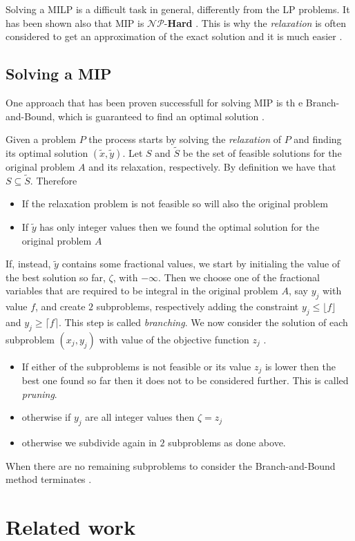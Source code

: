Solving a \acrshort{MILP} is a difficult task in general, differently from the
\acrshort{LP} problems. It has been shown also that \acrshort{MIP} is
$\mathcal{NP}$-\textbf{Hard}
\cite{Kannan1978}\cite{Liberti2019}\cite{Schrijver1998}. This is why the \emph{relaxation} is often considered
to get an approximation of the exact solution and it is much easier
\cite{Conforti2016}.

\subsection{Solving a MIP}%
\label{sub:solving_a_mip}

One approach that has been proven successfull for solving \acrshort{MIP} is th
e Branch-and-Bound, which is guaranteed to find an optimal solution
\cite{Conforti2016}\cite{Edgar2001}.

Given a problem $P$ the process starts by solving the \emph{relaxation} of $P$
and finding its optimal solution $(\tilde{x}, \tilde{y})$.
Let $S$ and  $\tilde{S}$ be the set of feasible solutions
for the original problem $A$ and its relaxation, respectively. By definition
we have that $S \subseteq \tilde{S} $.
Therefore \cite{Edgar2001}
\begin{itemize}
	\item If the relaxation problem is not feasible so will also the original
	      problem
	\item If $\tilde{y}$ has only integer values then we found the optimal
	      solution for the original problem $A$
\end{itemize}

If, instead, $\tilde{y}$ contains some fractional values, we start by
initialing the value of the best solution so far, $\zeta$, with $-\infty$.
Then we choose one of the fractional variables that are required to be integral
in the original problem $A$, say $y_j$ with value $f$, and create $2$
subproblems, respectively adding the constraint $y_{j} \leq \lfloor f \rfloor$
and $y_{j} \geq \lceil f \rceil$. This step is called \emph{branching}. We now
consider the solution of each subproblem $(x_j, y_j)$ with value of the
objective function $z_{j} $ \cite{Edgar2001}\cite{Conforti2016}.

\begin{itemize}
	\item If either of the subproblems is not feasible or its value $z_{j} $ is
	      lower then the best one found so far then it does not to be
	      considered further. This is called \emph{pruning}.
	\item otherwise if $y_{j} $ are all integer values then $\zeta = z_{j} $
	\item otherwise we subdivide again in $2$ subproblems as done above.
\end{itemize}

When there are no remaining subproblems to consider the Branch-and-Bound method
terminates \cite{Edgar2001}.

\section{Related work}%
\label{sec:related_work}
